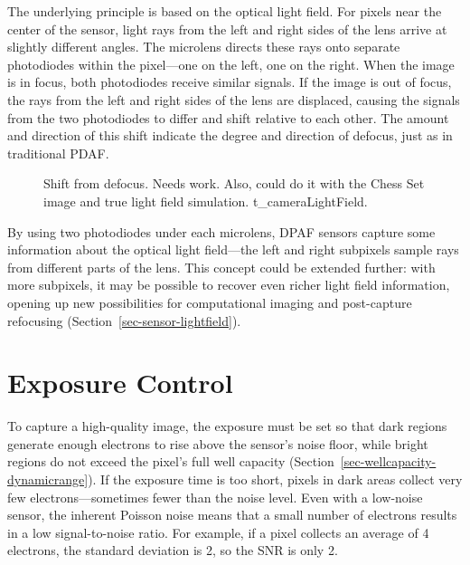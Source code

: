 \documentclass[
  letterpaper,
]{book}
\begin{document}
The underlying principle is based on the optical light field. For pixels
near the center of the sensor, light rays from the left and right sides
of the lens arrive at slightly different angles. The microlens directs
these rays onto separate photodiodes within the pixel---one on the left,
one on the right. When the image is in focus, both photodiodes receive
similar signals. If the image is out of focus, the rays from the left
and right sides of the lens are displaced, causing the signals from the
two photodiodes to differ and shift relative to each other. The amount
and direction of this shift indicate the degree and direction of
defocus, just as in traditional PDAF.

\begin{figure}


\caption{\label{fig-sensor-lf-shift}Shift from defocus. Needs work.
Also, could do it with the Chess Set image and true light field
simulation. t\_cameraLightField.}

\end{figure}%

By using two photodiodes under each microlens, DPAF sensors capture some
information about the optical light field---the left and right subpixels
sample rays from different parts of the lens. This concept could be
extended further: with more subpixels, it may be possible to recover
even richer light field information, opening up new possibilities for
computational imaging and post-capture refocusing
(Section~\ref{sec-sensor-lightfield}).

\section{Exposure Control}\label{sec-exposure-control}

To capture a high-quality image, the exposure must be set so that dark
regions generate enough electrons to rise above the sensor's noise
floor, while bright regions do not exceed the pixel's full well capacity
(Section~\ref{sec-wellcapacity-dynamicrange}). If the exposure time is
too short, pixels in dark areas collect very few electrons---sometimes
fewer than the noise level. Even with a low-noise sensor, the inherent
Poisson noise means that a small number of electrons results in a low
signal-to-noise ratio. For example, if a pixel collects an average of 4
electrons, the standard deviation is 2, so the SNR is only 2.
\end{document}
